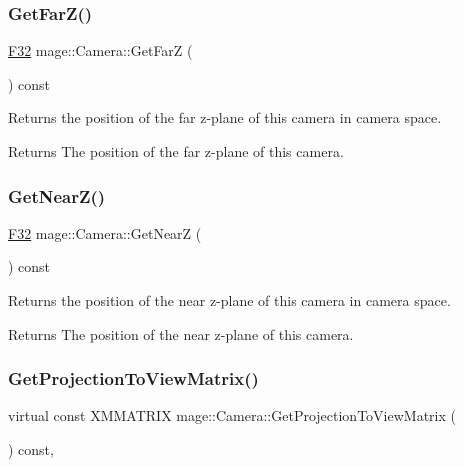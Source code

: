 \subsubsection{\texorpdfstring{Get\+Far\+Z()}{GetFarZ()}}
{\footnotesize\ttfamily \hyperlink{namespacemage_aa97e833b45f06d60a0a9c4fc22ae02c0}{F32} mage\+::\+Camera\+::\+Get\+FarZ (\begin{DoxyParamCaption}{ }\end{DoxyParamCaption}) const\hspace{0.3cm}{\ttfamily [noexcept]}}

Returns the position of the far z-\/plane of this camera in camera space.

\begin{DoxyReturn}{Returns}
The position of the far z-\/plane of this camera. 
\end{DoxyReturn}
\hypertarget{classmage_1_1_camera_add4054d66911dd183cdec85eda77b4a1}{}\label{classmage_1_1_camera_add4054d66911dd183cdec85eda77b4a1} 
\subsubsection{\texorpdfstring{Get\+Near\+Z()}{GetNearZ()}}
{\footnotesize\ttfamily \hyperlink{namespacemage_aa97e833b45f06d60a0a9c4fc22ae02c0}{F32} mage\+::\+Camera\+::\+Get\+NearZ (\begin{DoxyParamCaption}{ }\end{DoxyParamCaption}) const\hspace{0.3cm}{\ttfamily [noexcept]}}

Returns the position of the near z-\/plane of this camera in camera space.

\begin{DoxyReturn}{Returns}
The position of the near z-\/plane of this camera. 
\end{DoxyReturn}
\hypertarget{classmage_1_1_camera_a7a919b85084c79786a65c6df8872f6f1}{}\label{classmage_1_1_camera_a7a919b85084c79786a65c6df8872f6f1} 
\subsubsection{\texorpdfstring{Get\+Projection\+To\+View\+Matrix()}{GetProjectionToViewMatrix()}}
{\footnotesize\ttfamily virtual const X\+M\+M\+A\+T\+R\+IX mage\+::\+Camera\+::\+Get\+Projection\+To\+View\+Matrix (\begin{DoxyParamCaption}{ }\end{DoxyParamCaption}) const\hspace{0.3cm}{\ttfamily [pure virtual]}, {\ttfamily [noexcept]}}

